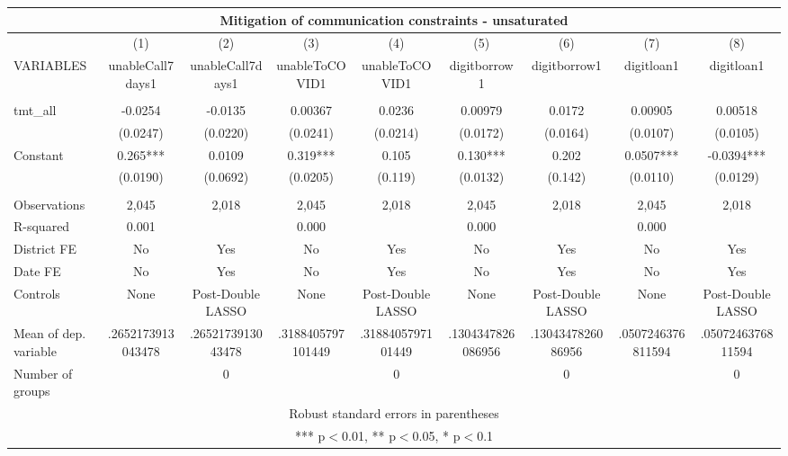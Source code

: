 \documentclass[]{article}
\begin{document}
\begin{tabular}{lcccccccc}
\multicolumn{9}{c}{Mitigation of communication constraints - unsaturated} \\ \hline
 & (1) & (2) & (3) & (4) & (5) & (6) & (7) & (8) \\
VARIABLES & unableCall7days1 & unableCall7days1 & unableToCOVID1 & unableToCOVID1 & digitborrow1 & digitborrow1 & digitloan1 & digitloan1 \\ \hline
 &  &  &  &  &  &  &  &  \\
tmt\_all & -0.0254 & -0.0135 & 0.00367 & 0.0236 & 0.00979 & 0.0172 & 0.00905 & 0.00518 \\
 & (0.0247) & (0.0220) & (0.0241) & (0.0214) & (0.0172) & (0.0164) & (0.0107) & (0.0105) \\
Constant & 0.265*** & 0.0109 & 0.319*** & 0.105 & 0.130*** & 0.202 & 0.0507*** & -0.0394*** \\
 & (0.0190) & (0.0692) & (0.0205) & (0.119) & (0.0132) & (0.142) & (0.0110) & (0.0129) \\
 &  &  &  &  &  &  &  &  \\
Observations & 2,045 & 2,018 & 2,045 & 2,018 & 2,045 & 2,018 & 2,045 & 2,018 \\
R-squared & 0.001 &  & 0.000 &  & 0.000 &  & 0.000 &  \\
District FE & No & Yes & No & Yes & No & Yes & No & Yes \\
Date FE & No & Yes & No & Yes & No & Yes & No & Yes \\
Controls & None & Post-Double LASSO & None & Post-Double LASSO & None & Post-Double LASSO & None & Post-Double LASSO \\
Mean of dep. variable & .2652173913043478 & .2652173913043478 & .3188405797101449 & .3188405797101449 & .1304347826086956 & .1304347826086956 & .0507246376811594 & .0507246376811594 \\
 Number of groups &  & 0 &  & 0 &  & 0 &  & 0 \\ \hline
\multicolumn{9}{c}{ Robust standard errors in parentheses} \\
\multicolumn{9}{c}{ *** p$<$0.01, ** p$<$0.05, * p$<$0.1} \\
\end{tabular}
\end{document}

